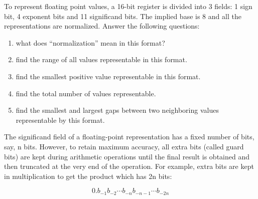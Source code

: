 \item To represent floating point values, a 16-bit register is divided into
        3 fields: 1 sign bit, 4 exponent bits and 11 significand bits. The implied 
        base is 8 and all the representations are normalized. Answer the following 
        questions:
        \begin{enumerate}
           \item what does ``normalization'' mean in this format?
           \item find the range of all values representable in this format. 
           \item find the smallest positive value representable in this format.
           \item find the total number of values representable.
           \item find the smallest and largest gaps between two neighboring values
                representable by this format.
        \end{enumerate}

\item The significand field of a floating-point representation has a fixed number of
        bits, say, n bits. However, to retain maximum accuracy, all extra bits (called
        guard bits) are kept during arithmetic operations until the final result is 
        obtained and then truncated at the very end of the operation. For example, 
        extra bits are kept in multiplication to get the product which has 2n bits:

        \[      0.b_{-1}b_{-2} \cdots b_{-n}b_{-n-1} \cdots b_{-2n}     \]

